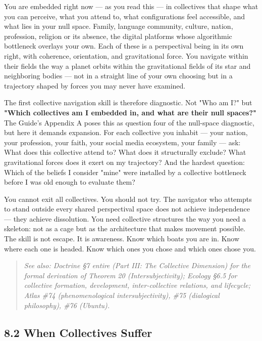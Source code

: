 You are embedded right now — as you read this — in collectives that shape what you can perceive, what you attend to, what configurations feel accessible, and what lies in your null space. Family, language community, culture, nation, profession, religion or its absence, the digital platforms whose algorithmic bottleneck overlays your own. Each of these is a perspectival being in its own right, with coherence, orientation, and gravitational force. You navigate within their fields the way a planet orbits within the gravitational fields of its star and neighboring bodies — not in a straight line of your own choosing but in a trajectory shaped by forces you may never have examined.


The first collective navigation skill is therefore diagnostic. Not "Who am I?" but \textbf{"Which collectives am I embedded in, and what are their null spaces?"} The Guide's Appendix A poses this as question four of the null-space diagnostic, but here it demands expansion. For each collective you inhabit — your nation, your profession, your faith, your social media ecosystem, your family — ask: What does this collective attend to? What does it structurally exclude? What gravitational forces does it exert on my trajectory? And the hardest question: Which of the beliefs I consider "mine" were installed by a collective bottleneck before I was old enough to evaluate them?


You cannot exit all collectives. You should not try. The navigator who attempts to stand outside every shared perspectival space does not achieve independence — they achieve dissolution. You need collective structures the way you need a skeleton: not as a cage but as the architecture that makes movement possible. The skill is not escape. It is awareness. Know which boats you are in. Know where each one is headed. Know which ones you chose and which ones chose you.


\begin{quote}
\itshape
\textit{See also: Doctrine §7 entire (Part III: The Collective Dimension) for the formal derivation of Theorem 20 (Intersubjectivity); Ecology §6.5 for collective formation, development, inter-collective relations, and lifecycle; Atlas \#74 (phenomenological intersubjectivity), \#75 (dialogical philosophy), \#76 (Ubuntu).}
\end{quote}


\bigskip\noindent\makebox[\textwidth]{\color{rulegray}\rule{5cm}{0.3pt}}\bigskip


\subsection*{8.2 When Collectives Suffer}


